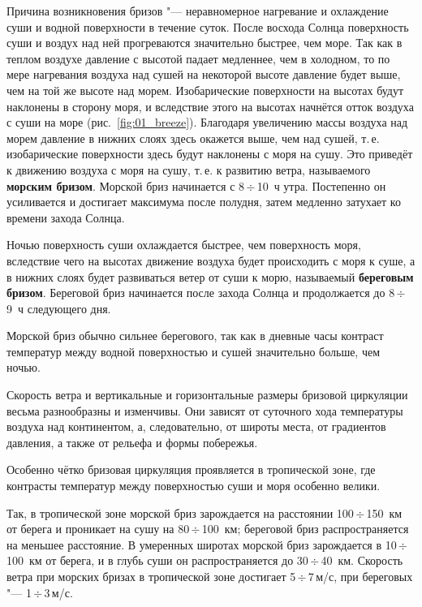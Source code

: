 \documentclass[a4paper, 12pt, twoside, draft, book, russian, fittopage, cyremdash, openright]{ncc}
\newcommand{\mps}{\,м/с\xspace}
\newcommand{\otdo}{\,\ensuremath{\div}\,}
\begin{document}
Причина возникновения бризов "--- неравномерное нагревание и
охлаждение суши и водной поверхности в течение суток. После восхода
Солнца поверхность суши и воздух над ней прогреваются значительно
быстрее, чем море. Так как в теплом воздухе давление с высотой падает
медленнее, чем в холодном, то по мере нагревания воздуха над сушей на
некоторой высоте давление будет выше, чем на той же высоте над
морем. Изобарические поверхности на высотах будут наклонены в сторону
моря, и вследствие этого на высотах начнётся отток воздуха с суши на
море (рис.~\ref{fig:01_breeze}). Благодаря увеличению массы воздуха
над морем давление в нижних слоях здесь окажется выше, чем над сушей,
т.\,е. изобарические поверхности здесь будут наклонены с моря на
сушу. Это приведёт к движению воздуха с моря на сушу, т.\,е. к развитию
ветра, называемого \textbf{морским
  бризом}. Морской бриз начинается с 8\otdo10~ч
утра. Постепенно он усиливается и достигает максимума после полудня,
затем медленно затухает ко времени захода Солнца.

Ночью поверхность суши охлаждается быстрее, чем поверхность моря,
вследствие чего на высотах движение воздуха будет происходить с моря к
суше, а в нижних слоях будет развиваться ветер от суши к морю,
называемый \textbf{береговым бризом}. Береговой
бриз начинается после захода Солнца и продолжается до 8\otdo9~ч
следующего дня.

Морской бриз обычно сильнее берегового, так как в дневные часы
контраст температур между водной поверхностью и сушей значительно
больше, чем ночью.

Скорость ветра и вертикальные и горизонтальные размеры бризовой
циркуляции весьма разнообразны и изменчивы. Они зависят от суточного
хода температуры воздуха над континентом, а, следовательно, от широты
места, от градиентов давления, а также от рельефа и формы побережья.

Особенно чётко бризовая циркуляция проявляется в тропической зоне, где
контрасты температур между поверхностью суши и моря особенно велики.

Так, в тропической зоне морской бриз зарождается на расстоянии
100\otdo150~км от берега и проникает на сушу на 80\otdo100~км; береговой
бриз распространяется на меньшее расстояние. В умеренных широтах
морской бриз зарождается в 10\otdo100~км от берега, и в глубь суши он
распространяется до 30\otdo40~км. Скорость ветра при морских бризах в
тропической зоне достигает 5\otdo7\mps, при береговых "--- 1\otdo3\mps.
\end{document}
